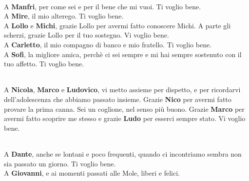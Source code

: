 \documentclass[main]{subfiles}
\begin{document}
\noindent\\
A \textbf{Manfri}, per come sei e per il bene che mi vuoi. Ti voglio bene.
\noindent\\
A \textbf{Mire}, il mio alterego. Ti voglio bene.
\noindent\\
A \textbf{Lollo} e \textbf{Michi}, grazie Lollo per avermi fatto conoscere Michi. A parte gli scherzi, grazie Lollo
per il tuo sostegno. Vi voglio bene. 
\noindent\\ 
A \textbf{Carletto}, il mio compagno di banco e mio fratello. Ti voglio bene.
\noindent\\
A \textbf{Sofi}, la migliore amica, perchè ci sei sempre e mi hai sempre sostenuto con il tuo affetto. Ti voglio bene.

\noindent\\
A \textbf{Nicola}, \textbf{Marco} e \textbf{Ludovico}, vi metto assieme per dispetto, e per ricordarvi dell'adolescenza
che abbiamo passato insieme. Grazie \textbf{Nico} per avermi fatto provare la prima canna. Sei un coglione, nel senso più buono.
Grazie \textbf{Marco} per avermi fatto scoprire me stesso e grazie \textbf{Ludo} per esserci sempre stato. Vi voglio bene.

\noindent\\
A \textbf{Dante}, anche se lontani e poco frequenti, quando ci incontriamo sembra non sia passato un giorno. Ti voglio bene.
\noindent\\
A \textbf{Giovanni}, e ai momenti passati alle Mole, liberi e felici. 
\end{document}
